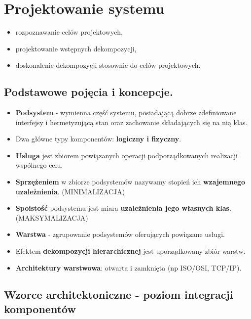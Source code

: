 \documentclass[a4paper]{article}
\begin{document}
    \section{Projektowanie systemu}
    \begin{itemize}
        \item rozpoznawanie celów projektowych,
        \item projektowanie wstępnych dekompozycji,
        \item doskonalenie dekompozycji stosownie do celów projektowych.
    \end{itemize}

    \subsection{Podstawowe pojęcia i koncepcje.}
    \begin{itemize}
        \item \textbf{Podsystem} - wymienna część systemu, posiadającą dobrze zdefiniowane interfejsy i
        hermetyzującą stan oraz zachowanie składających się na nią klas.
        \item Dwa główne typy komponentów: \textbf{logiczny i fizyczny}.
        \item \textbf{Usługa} jest zbiorem powiązanych operacji podporządkowanych realizacji wspólnego
        celu.
        \item \textbf{Sprzężeniem} w zbiorze podsystemów nazywamy stopień ich \textbf{wzajemnego uzależnienia}. (MINIMALIZACJA)
        \item \textbf{Spoistość} podsystemu jest miara \textbf{uzależnienia jego własnych klas}. (MAKSYMALIZACJA)
        \item \textbf{Warstwa} - zgrupowanie podsystemów oferujących powiązane usługi.
        \item Efektem \textbf{dekompozycji hierarchicznej} jest uporządkowany zbiór warstw.
        \item \textbf{Architektury warstwowa}: otwarta i zamknięta (np ISO/OSI, TCP/IP).
    \end{itemize}


    \subsection{Wzorce architektoniczne - poziom integracji komponentów}
\end{document}
